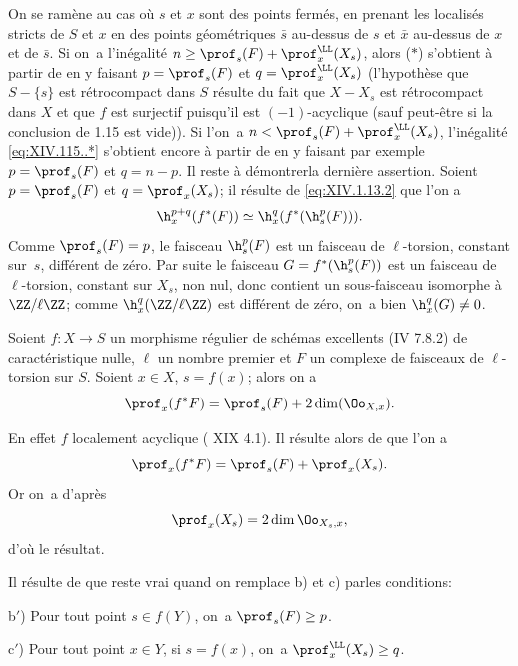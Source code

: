 On se ram\`ene au cas o\`u $s$ et $x$ sont des points ferm\'es, en prenant les localis\'es stricts de $S$ et $x$ en des points g\'eom\'etriques $\bar s$ au-dessus de $s$ et $\bar x$ au-dessus de $x$ et de $\bar s$. Si on~a l'in\'egalit\'e $n\geq\prof_s(F)+\prof_x^\LL(X_s)$, alors ($*$) s'obtient \`a partir de  en y faisant $p=\prof_s(F)$ et $q=\prof_x^\LL(X_s)$ (l'hypoth\`ese que $S-\{s\}$ est r\'etrocompact dans $S$ r\'esulte du fait que $X-X_s$ est r\'etrocompact dans $X$ et que $f$ est surjectif puisqu'il est $(-1)$-acyclique (sauf peut-\^etre si la conclusion de 1.15 est vide)). Si l'on~a $n<\prof_s(F)+\prof_x^\LL(X_s)$, l'in\'egalit\'e \eqref{eq:XIV.115..*} s'obtient encore \`a partir de  en y faisant par exemple $p=\prof_s(F)$ et $q=n-p$. Il reste \`a d\'emontrer\pageoriginale la derni\`ere assertion. Soient $p=\prof_s(F)$ et $q=\prof_x(X_s)$; il r\'esulte de \eqref{eq:XIV.1.13.2} que l'on a
$$
\h_x^{p+q}(f^*(F))\simeq \h_x^q(f^*(\h^p_s(F))).
$$
Comme $\prof_s(F)=p$, le faisceau $\h^p_s(F)$ est un faisceau de $\ell$-torsion, constant sur~$s$, diff\'erent de z\'ero. Par suite le faisceau $G=f^*(\h_s^p(F))$ est un faisceau de $\ell$-torsion, constant sur $X_s$, non nul, donc contient un sous-faisceau isomorphe \`a $\ZZ/\ell\ZZ$; comme $\h_x^q(\ZZ/\ell\ZZ)$ est diff\'erent de z\'ero, on~a bien $\h_x^q(G)\neq 0$.

\begin{corollaire} \label{XIV.1.16}
Soient $f:X\to S$ un morphisme r\'egulier de sch\'emas excellents (\textup{\EGA IV 7.8.2}) de caract\'eristique nulle, $\ell$ un nombre premier et $F$ un complexe de faisceaux de $\ell$-torsion sur $S$. Soient $x\in X$, $s=f(x)$; alors on a
$$
\prof_x(f^*F)=\prof_s(F)+2\dim(\Oo_{X, x}).
$$
\end{corollaire}

En effet $f$  localement acyclique ( XIX 4.1). Il r\'esulte alors de  que l'on a
$$
\prof_x(f^*F)=\prof_s(F)+\prof_x(X_s).
$$
Or on~a d'apr\`es 
$$
\prof_x(X_s)=2\dim\Oo_{X_s, x},
$$
d'o\`u le r\'esultat.

\begin{remarque} \label{XIV.1.17}
Il r\'esulte de  que  reste vrai quand on remplace b) et c) par\pageoriginale les conditions:

b$'$) Pour tout point $s\in f(Y)$, on~a $\prof_s(F)\geq p$.

c$'$) Pour tout point $x\in Y$, si $s=f(x)$, on~a $\prof^\LL_x(X_s)\geq q$.
\end{remarque}

